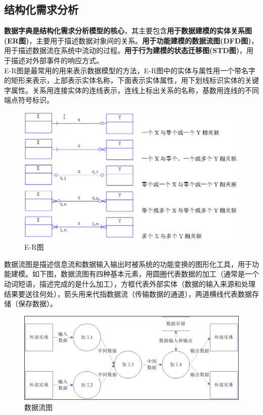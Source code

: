 \documentclass[chapter.computer_science.tex]{subfiles}
\begin{document}
\subsection{结构化需求分析}
{\bfseries 数据字典是结构化需求分析模型的核心}，其主要包含{\bfseries 用于数据建模的实体关系图(ER图)}，主要用于描述数据对象间的关系。{\bfseries 用于功能建模的数据流图(DFD图)}，用于描述数据流在系统中流动的过程。{\bfseries 用于行为建模的状态迁移图(STD图)}，用于描述对外部事件的响应方式。\\
E-R图是最常用的用来表示数据模型的方法，E-R图中的实体与属性用一个带名字的矩形来表示，上部表示实体名称，下面表示实体属性，用下划线标识实体的关键字属性。关系用连接实体的连线表示，连线上标出关系的名称，基数用连线的不同端点符号标识。\\
\begin{figure}
    \centering
    \includegraphics[scale=0.5]{./images/0034.png}
    \caption{E-R图}
\end{figure}
数据流图是描述信息流和数据输入输出时被系统的功能变换的图形化工具，用于功能建模。如下图，数据流图有四种基本元素，用圆圈代表数据的加工（通常是一个动词短语，描述完成的是什么加工），方框代表外部实体（数据的输入来源和处理结果要送往何处），箭头用来代指数据流（传输数据的通道），两道横线代表数据存储（保存数据）。\\
\begin{figure}[H]
    \centering
    \includegraphics[scale=0.5]{./images/0035.png}
    \caption{数据流图}
\end{figure}
\end{document}
